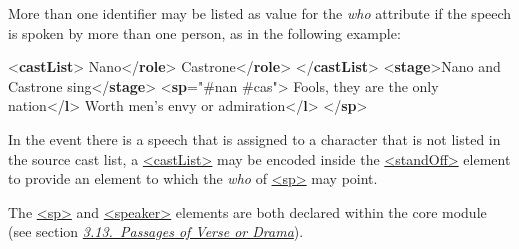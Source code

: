 More than one identifier may be listed as value for the {\itshape who} attribute if the speech is spoken by more than one person, as in the following example: \par\bgroup{}\exampleFont \begin{shaded}\noindent\mbox{}{<\textbf{castList}>}\mbox{}\newline 
{}\mbox{}\newline 
\hspace*{1em}Nano{</\textbf{role}>}\mbox{}\newline 
{}\mbox{}\newline 
{}\mbox{}\newline 
\hspace*{1em}Castrone{</\textbf{role}>}\mbox{}\newline 
{}\mbox{}\newline 
{</\textbf{castList}>}\mbox{}\newline 
{<\textbf{stage}>}Nano and Castrone sing{</\textbf{stage}>}\mbox{}\newline 
{<\textbf{sp}\hspace*{1em}{who}="{\#nan \#cas}">}\mbox{}\newline 
{}Fools, they are the only nation{</\textbf{l}>}\mbox{}\newline 
{}Worth men's envy or admiration{</\textbf{l}>}\mbox{}\newline 
{</\textbf{sp}>}\end{shaded}\egroup\par \noindent  \par
In the event there is a speech that is assigned to a character that is not listed in the source cast list, a \hyperref[TEI.castList]{<castList>} may be encoded inside the \hyperref[TEI.standOff]{<standOff>} element to provide an element to which the {\itshape who} of \hyperref[TEI.sp]{<sp>} may point.\par
The \hyperref[TEI.sp]{<sp>} and \hyperref[TEI.speaker]{<speaker>} elements are both declared within the core module (see section \textit{\hyperref[CODV]{3.13.\ Passages of Verse or Drama}}).
